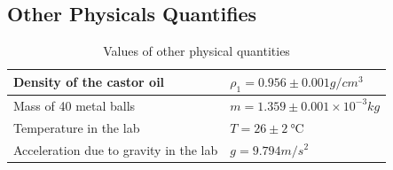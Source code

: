 \documentclass[12pt]{article}
\begin{document}
    \subsection{Other Physicals Quantifies}
    \begin{table}[htbp]
        \centering
        \begin{tabular}{ll}
            \hline\hline
            Density of the castor oil & $\rho_1=0.956\pm 0.001g/cm^3$\\
            \hline
            Mass of 40 metal balls & $m=1.359\pm 0.001\times10^{-3}kg$\\
            \hline      
            Temperature in the lab & $T=26\pm \SI{2}{\degreeCelsius}$\\
            \hline
            Acceleration due to gravity in the lab & $g=9.794m/s^2$\\        
            \hline\hline
        \end{tabular}\\
        \caption{Values of other physical quantities}
        \label{other}
    \end{table}
\end{document}
